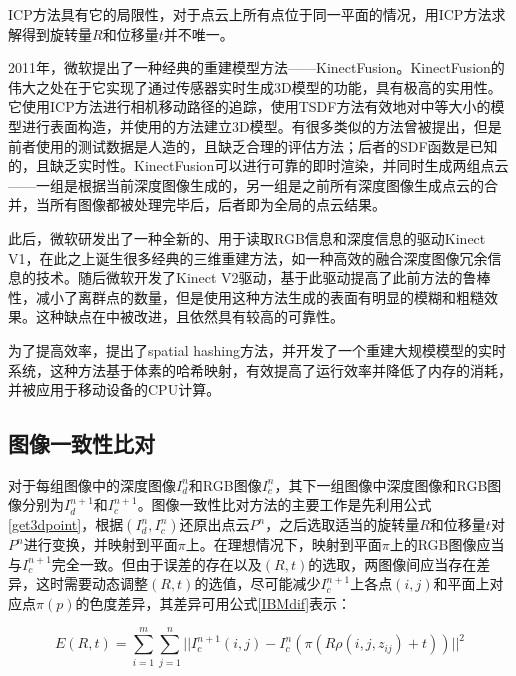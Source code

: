 \documentclass{llncs}
\begin{document}
\begin{CJK}{UTF8}{song}
ICP方法具有它的局限性，对于点云上所有点位于同一平面的情况，用ICP方法求解得到旋转量$R$和位移量$t$并不唯一。

2011年，微软提出了一种经典的重建模型方法——KinectFusion。KinectFusion\cite{DBLP:conf/ismar/NewcombeIHMKDKSHF11}的伟大之处在于它实现了通过传感器实时生成3D模型的功能，具有极高的实用性。它使用ICP方法进行相机移动路径的追踪，使用TSDF方法有效地对中等大小的模型进行表面构造，并使用\cite{DBLP:conf/siggraph/CurlessL96}的方法建立3D模型。有很多类似的方法曾被提出\cite{DBLP:conf/cimaging/KubackiBBD12,DBLP:conf/eccv/RenR12}，但是前者使用的测试数据是人造的，且缺乏合理的评估方法；后者的SDF函数是已知的，且缺乏实时性。KinectFusion可以进行可靠的即时渲染，并同时生成两组点云——一组是根据当前深度图像生成的，另一组是之前所有深度图像生成点云的合并，当所有图像都被处理完毕后，后者即为全局的点云结果。

此后，微软研发出了一种全新的、用于读取RGB信息和深度信息的驱动Kinect V1，在此之上诞生很多经典的三维重建方法，如一种高效的融合深度图像冗余信息的技术\cite{DBLP:conf/scia/KyostilaCKH13}。随后微软开发了Kinect V2驱动，\cite{DBLP:conf/scia/YlimakiKH17}基于此驱动提高了此前方法的鲁棒性，减小了离群点的数量，但是使用这种方法生成的表面有明显的模糊和粗糙效果。这种缺点在\cite{DBLP:journals/corr/abs-1804-08912}中被改进，且依然具有较高的可靠性。

为了提高效率，\cite{DBLP:journals/tog/NiessnerZIS13}提出了spatial hashing方法，并开发了一个重建大规模模型的实时系统，这种方法基于体素的哈希映射，有效提高了运行效率并降低了内存的消耗，并被应用于移动设备的CPU计算\cite{DBLP:conf/rss/KlingensmithDSX15}。




	\subsection{图像一致性比对}

对于每组图像中的深度图像$I^n_d$和RGB图像$I^n_c$，其下一组图像中深度图像和RGB图像分别为$I^{n+1}_d$和$I^{n+1}_c$。图像一致性比对方法的主要工作是先利用公式\ref{get3dpoint}，根据$(I^n_d,I^n_c)$还原出点云$P^n$，之后选取适当的旋转量$R$和位移量$t$对$P^n$进行变换，并映射到平面$\pi$上\cite{DBLP:conf/iccvw/SteinbruckerSC11}。在理想情况下，映射到平面$\pi$上的RGB图像应当与$I^{n+1}_c$完全一致。但由于误差的存在以及$(R,t)$的选取，两图像间应当存在差异，这时需要动态调整$(R,t)$的选值，尽可能减少$I^{n+1}_c$上各点$(i,j)$和平面上对应点$\pi(p)$的色度差异，其差异可用公式\ref{IBMdif}表示：

\begin{equation}
\label{IBMdif}
E(R,t) = \sum^m_{i=1}\sum^n_{j=1}||I^{n+1}_c(i,j)-I^n_c(\pi(R\rho(i,j,z_{ij})+t))||^2
\end{equation}


\end{CJK}
\end{document}
